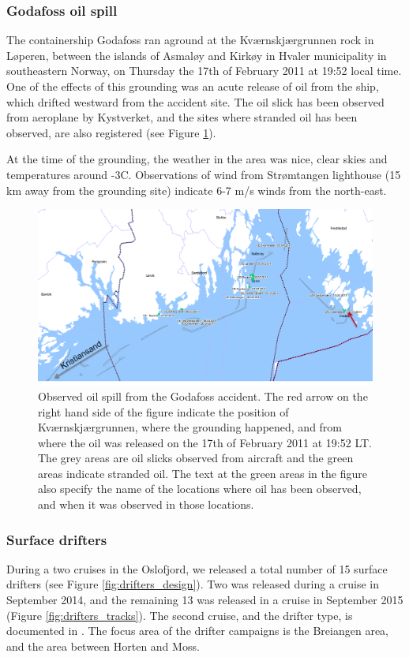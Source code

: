 \subsubsection{Godafoss oil spill}
\label{sect:godafoss_obs}
The containership Godafoss ran aground at the Kv{\ae}rnskj{\ae}rgrunnen rock in L{\o}peren, between the islands of Asmal{\o}y and Kirk{\o}y in Hvaler municipality in southeastern Norway, on Thursday the 17th of February 2011 at 19:52 local time. One of the effects of this grounding was an acute release of oil from the ship, which drifted westward from the accident site. The oil slick has been observed from aeroplane by Kystverket, and the sites where stranded oil has been observed, are also registered (see Figure \ref{fig:godafoss_oil}).

At the time of the grounding, the weather in the area was nice, clear skies and temperatures around -3C. Observations of wind from Str{\o}mtangen lighthouse (15 km away from the grounding site) indicate 6-7 m/s winds from the north-east.

\begin{figure}[ht]
\centerline{
\includegraphics*[width=\textwidth]{Figurer/Godafoss}
}
\caption{\small
Observed oil spill from the Godafoss accident. The red arrow on the right hand side of the figure indicate the position of Kv{\ae}rnskj{\ae}rgrunnen, where the grounding happened, and from where the oil was released on the 17th of February 2011 at 19:52 LT. The grey areas are oil slicks observed from aircraft and the green areas indicate stranded oil. The text at the green areas in the figure also specify the name of the locations where oil has been observed, and when it was observed in those locations.}
\label{fig:godafoss_oil}
\end{figure}

\subsubsection{Surface drifters}
During a two cruises in the Oslofjord, we released a total number of 15 surface drifters (see Figure \ref{fig:drifters_design}). Two was released during a cruise in September 2014, and the remaining 13 was released in a cruise in September 2015 (Figure \ref{fig:drifters_tracks}). The second cruise, and the drifter type, is documented in \cite{hjelm:etal:2016}. The focus area of the drifter campaigns is the Breiangen area, and the area between Horten and Moss.

